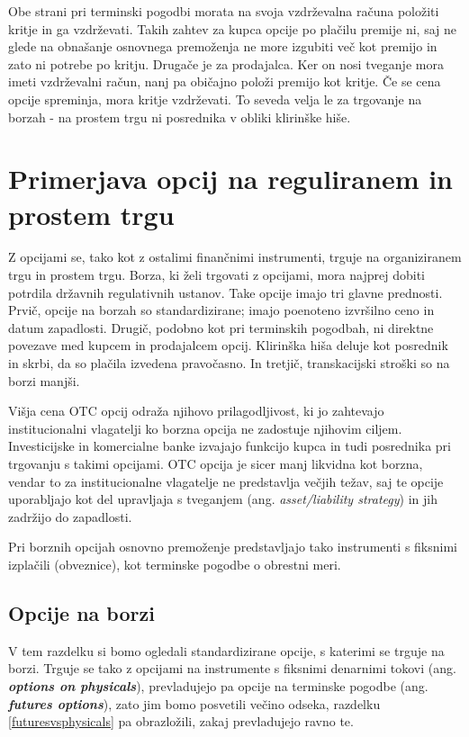 \documentclass[a4paper]{article}
\begin{document}
Obe strani pri terminski pogodbi morata na svoja vzdrževalna računa položiti kritje in ga vzdrževati. Takih zahtev za kupca opcije
po plačilu premije ni, saj ne glede na obnašanje osnovnega premoženja ne more izgubiti več kot premijo in zato ni potrebe po kritju.
Drugače je za prodajalca. Ker on nosi tveganje mora imeti vzdrževalni račun, nanj pa običajno položi premijo kot kritje. Če se cena 
opcije spreminja, mora kritje vzdrževati. To seveda velja le za trgovanje na borzah - na prostem trgu ni posrednika v obliki klirinške hiše.

\section{Primerjava opcij na reguliranem in prostem trgu}
Z opcijami se, tako kot z ostalimi finančnimi instrumenti, trguje na organiziranem trgu in prostem trgu. Borza, ki želi trgovati
z opcijami, mora najprej dobiti potrdila državnih regulativnih ustanov. Take opcije imajo tri glavne prednosti. Prvič, opcije na borzah
so standardizirane; imajo poenoteno izvršilno ceno in datum zapadlosti. Drugič, podobno kot pri terminskih pogodbah, ni direktne povezave
med kupcem in prodajalcem opcij. Klirinška hiša deluje kot posrednik in skrbi, da so plačila izvedena pravočasno. In tretjič, transkacijski
stroški so na borzi manjši. 

Višja cena OTC opcij odraža njihovo prilagodljivost, ki jo zahtevajo institucionalni vlagatelji ko borzna opcija ne zadostuje
njihovim ciljem. Investicijske in komercialne banke izvajajo funkcijo kupca in tudi posrednika pri trgovanju s takimi
opcijami. OTC opcija je sicer manj likvidna kot borzna, vendar to za institucionalne vlagatelje ne predstavlja večjih težav, 
saj te opcije uporabljajo kot del upravljaja s tveganjem (ang. \textit{asset/liability strategy}) in jih zadržijo do zapadlosti.

Pri borznih opcijah osnovno premoženje predstavljajo tako instrumenti s fiksnimi izplačili (obveznice),
kot terminske pogodbe o obrestni meri.

\subsection{Opcije na borzi}
V tem razdelku si bomo ogledali standardizirane opcije, s katerimi se trguje na borzi. Trguje se 
tako z opcijami na instrumente s fiksnimi denarnimi tokovi  (ang. \textit{\textbf{options on physicals}}), 
prevladujejo pa opcije na terminske pogodbe (ang. \textit{\textbf{futures options}}),
zato jim bomo posvetili večino odseka, razdelku \ref{futuresvsphysicals} pa obrazložili, zakaj prevladujejo ravno te.
\end{document}
